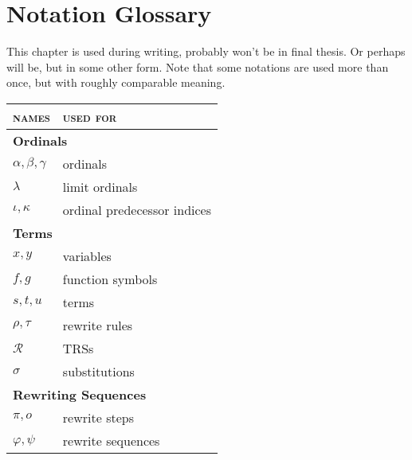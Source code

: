 \chapter*{Notation Glossary}\label{chap:glossary}

This chapter is used during writing, probably won't be in final
thesis. Or perhaps will be, but in some other form. Note that some
notations are used more than once, but with roughly comparable
meaning.

{\renewcommand{\arraystretch}{1.1}
\renewcommand{\tabcolsep}{10pt}
\begin{tabular}{p{150pt} p{175pt}}
\textsc{names} & \textsc{used for}\\
\hline
\multicolumn{2}{l}{\bf Ordinals}\\
$\alpha, \beta, \gamma$ & ordinals\\
$\lambda$ & limit ordinals\\
$\iota, \kappa$ & ordinal predecessor indices\\
\multicolumn{2}{l}{\bf Terms}\\
$x, y$ & variables\\
$f, g$ & function symbols\\
$s, t, u$ & terms\\
$\rho, \tau$ & rewrite rules\\
$\mathcal{R}$ & TRSs\\
$\sigma$ & substitutions\\
\multicolumn{2}{l}{\bf Rewriting Sequences}\\
$\pi, o$ & rewrite steps\\
$\varphi, \psi$ & rewrite sequences\\
\end{tabular}}

